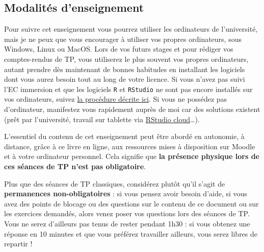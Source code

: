 \documentclass[
  a4paper,
  DIV=11,
  numbers=noendperiod,
  oneside]{scrreprt}
\begin{document}
\hypertarget{modalituxe9s-denseignement}{%
\subsection*{Modalités
d'enseignement}\label{modalituxe9s-denseignement}}

Pour suivre cet enseignement vous pourrez utiliser les ordinateurs de
l'université, mais je ne peux que vous encourager à utiliser vos propres
ordinateurs, sous Windows, Linux ou MacOS. Lors de vos futurs stages et
pour rédiger vos comptes-rendus de TP, vous utiliserez le plus souvent
vos propres ordinateurs, autant prendre dès maintenant de bonnes
habitudes en installant les logiciels dont vous aurez besoin tout au
long de votre licence. Si vous n'avez pas suivi l'EC immersion et que
les logiciels \texttt{R} et \texttt{RStudio} ne sont pas encore
installés sur vos ordinateurs, suivez
\href{https://besibo.github.io/BiometrieS3/01-R-basics.html\#sec-install}{la
procédure décrite ici}. Si vous ne possédez pas d'ordinateur, manifestez
vous rapidement auprès de moi car des solutions existent (prêt par
l'université, travail sur tablette via
\href{https://rstudio.cloud}{RStudio cloud}\ldots).

\begin{tcolorbox}[enhanced jigsaw, breakable, toprule=.15mm, colbacktitle=quarto-callout-important-color!10!white, colframe=quarto-callout-important-color-frame, arc=.35mm, bottomtitle=1mm, opacityback=0, title=\textcolor{quarto-callout-important-color}{\faExclamation}\hspace{0.5em}{Important}, bottomrule=.15mm, colback=white, toptitle=1mm, rightrule=.15mm, leftrule=.75mm, opacitybacktitle=0.6, left=2mm, titlerule=0mm, coltitle=black]

L'essentiel du contenu de cet enseignement peut être abordé en
autonomie, à distance, grâce à ce livre en ligne, aux ressources mises à
disposition sur Moodle et à votre ordinateur personnel. Cela signifie
que \textbf{la présence physique lors de ces séances de TP n'est pas
obligatoire}.

\end{tcolorbox}

Plus que des séances de TP classiques, considérez plutôt qu'il s'agit de
\textbf{permanences non-obligatoires} : si vous pensez avoir besoin
d'aide, si vous avez des points de blocage ou des questions sur le
contenu de ce document ou sur les exercices demandés, alors venez poser
vos questions lors des séances de TP. Vous ne serez d'ailleurs pas tenus
de rester pendant 1h30 : si vous obtenez une réponse en 10 minutes et
que vous préférez travailler ailleurs, vous serez libres de repartir !
\end{document}
